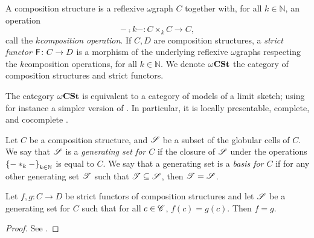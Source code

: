 \begin{dfn} 
    A composition structure is a reflexive \( \omega \)\nbd graph \( C \) together with, for all \( k \in \mathbb{N} \), an operation
    \begin{equation*}
        - \comp{k} - \colon C \times_k C \to C,
    \end{equation*}
    call the \emph{\( k \)\nbd composition operation}.
    If \( C, D \) are composition structures, a \emph{strict functor} \( \mathsf{F} \colon C \to D \) is a morphism of the underlying reflexive  \( \omega \)\nbd graphs respecting the \( k \)\nbd composition operations, for all \( k \in \mathbb{N} \).
    We denote \( \omega\mathbf{CSt} \) the category of composition structures and strict functors.
\end{dfn}

\begin{rmk}
    The category \( \omega\mathbf{CSt} \) is equivalent to a category of models of a limit sketch; using for instance a simpler version of \cite[Proposition 14.2.4]{ara2025polygraphs}.
    In particular, it is locally presentable, complete, and cocomplete \cite{adamek1994locally}.
\end{rmk}

\begin{dfn} 
    Let \( C \) be a composition structure, and \( \mathscr{S} \) be a subset of the globular cells of \( C \).
    We say that \( \mathscr{S} \) is a \emph{generating set for \( C \)} if the closure of \( \mathscr{S} \) under the operations \( \left\{ {- *_{k} -} \right\}_{k \in \mathbb{N}} \) is equal to \( C \).
    We say that a generating set is a \emph{basis for \( C \)} if for any other generating set \( \mathscr{T} \) such that \( \mathscr{T} \subseteq \mathscr{S} \), then \( \mathscr{T} = \mathscr{S} \).
\end{dfn}

\begin{lem}\label{lem:strict_functor_determined_by_basis}
    Let \( f, g \colon C \to D \) be strict functors of composition structures and let \( \mathscr{S} \) be a generating set for \( C \) such that for all \( c \in \mathscr{C} \), \( f(c) = g(c) \).
    Then \( f = g \).
\end{lem}
\begin{proof}
    See \cite[Lemma 5.1.23]{hadzihasanovic2024combinatorics}.
\end{proof}

